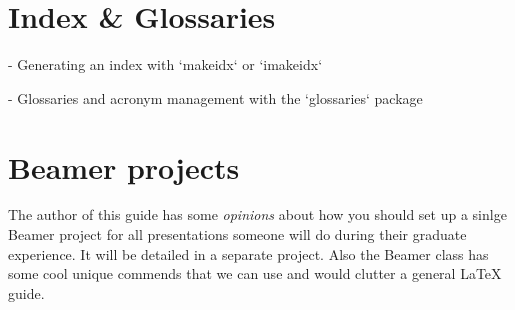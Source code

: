 \documentclass[]{article}
\begin{document}
\section{Index \& Glossaries}
- Generating an index with `makeidx` or `imakeidx`

- Glossaries and acronym management with the `glossaries` package
\section{Beamer projects}
The author of this guide has some \textit{opinions} about how you should set up a sinlge Beamer project for all presentations someone will do during their graduate experience. It will be detailed in a separate project. Also the Beamer class has some cool unique commends that we can use and would clutter a general LaTeX guide.
\end{document}
